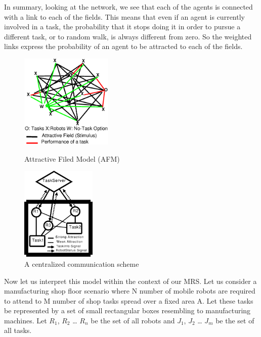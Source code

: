 \documentclass{llncs}
\begin{document}
In summary, looking at the network, we see that each of the agents is connected with a link to each of the fields. This means that even if an agent is currently involved in a task, the probability that it stops doing it in order to pursue a different task, or to random walk, is always different from zero. So the weighted links express the probability of an agent to be attracted to each of the fields.\\
\begin{figure}
\begin{minipage}[t]{0.48\linewidth}
\centering
\includegraphics[height=4.5cm, angle=0]{../dia-files/AFM-Diag2.eps}
\caption{\small Attractive Filed Model (AFM)}
\label{fig:afm} %
\end{minipage}
\hspace{0.5cm}
\begin{minipage}[t]{0.48\linewidth}
\centering
\includegraphics[height=4.5cm, angle=0]{../dia-files/CentralizedComm.eps}
\caption{\small A centralized communication scheme} %
\label{fig:ccm} %
\end{minipage}
\end{figure}
Now let us interpret this model within the context of our MRS. Let us consider a manufacturing shop floor scenario where N number of mobile robots are required to attend to M number of shop tasks spread over a fixed area A.
Let these tasks be represented by a set of small rectangular boxes resembling to manufacturing machines.
Let $R_1$, $R_2$ … $R_n$ be the set of all robots and $J_1$, $J_2$ … $J_m$ be the set of all tasks.
\end{document}
